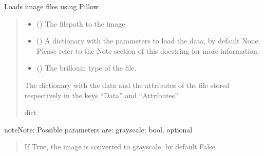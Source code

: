 \documentclass[letterpaper,10pt,english]{sphinxmanual}
\begin{document}

\begin{fulllineitems}
\label{\detokenize{_autosummary/HDF5_BLS.load_data:HDF5_BLS.load_data.load_image_file}}
\pysigstartsignatures
\pysiglinewithargsret
{}
{\sphinxparamcomma {}\sphinxparamcomma {}}
{}
\pysigstopsignatures
\sphinxAtStartPar
Loads image files using Pillow
\begin{quote}\begin{description}
\begin{itemize}
\item {} 
\sphinxAtStartPar
{} () \textendash{} The filepath to the image

\item {} 
\sphinxAtStartPar
{} (\sphinxstyleliteralemphasis{\sphinxupquote{, }}) \textendash{} A dictionary with the parameters to load the data, by default None. Please refer to the Note section of this docstring for more information.

\item {} 
\sphinxAtStartPar
{} (\sphinxstyleliteralemphasis{\sphinxupquote{, }}) \textendash{} The brillouin type of the file.

\end{itemize}

\sphinxAtStartPar
The dictionary with the data and the attributes of the file stored respectively in the keys “Data” and “Attributes”

\sphinxAtStartPar
dict

\end{description}\end{quote}

\begin{sphinxadmonition}{note}{Note:}
\sphinxAtStartPar
Possible parameters are:
\sphinxhyphen{} grayscale: bool, optional
\begin{quote}

\sphinxAtStartPar
If True, the image is converted to grayscale, by default False
\end{quote}
\end{sphinxadmonition}

\end{fulllineitems}
\end{document}
